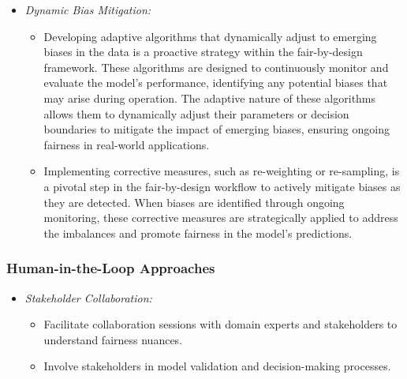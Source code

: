 \documentclass[12pt,a4paper,openright,twoside]{book}
\begin{document}
\begin{itemize}
    
    \item \emph{Dynamic Bias Mitigation:}
    
    \begin{itemize}
    
        \item Developing adaptive algorithms that dynamically adjust to emerging biases in the data is a proactive strategy within the fair-by-design framework. These algorithms are designed to continuously monitor and evaluate the model's performance, identifying any potential biases that may arise during operation. The adaptive nature of these algorithms allows them to dynamically adjust their parameters or decision boundaries to mitigate the impact of emerging biases, ensuring ongoing fairness in real-world applications.
    
        \item Implementing corrective measures, such as re-weighting or re-sampling, is a pivotal step in the fair-by-design workflow to actively mitigate biases as they are detected. When biases are identified through ongoing monitoring, these corrective measures are strategically applied to address the imbalances and promote fairness in the model's predictions.
    
    \end{itemize}

\end{itemize}

\subsubsection{Human-in-the-Loop Approaches}

\begin{itemize}
    
    \item \emph{Stakeholder Collaboration:}
    
    \begin{itemize}
    
        \item Facilitate collaboration sessions with domain experts and stakeholders to understand fairness nuances.
    
        \item Involve stakeholders in model validation and decision-making processes.
    
    \end{itemize}

\end{itemize}
\end{document}

